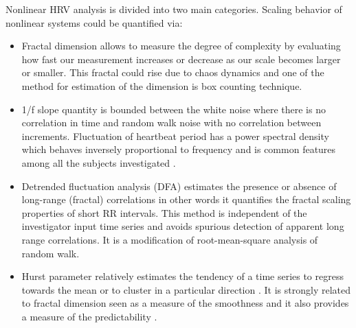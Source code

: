 Nonlinear HRV analysis is divided into two main categories. Scaling behavior of nonlinear systems could be quantified via:
\begin{itemize}
    \item Fractal dimension allows to measure the degree of complexity by evaluating how fast our measurement increases or decrease as our scale becomes larger or smaller. This fractal could rise due to chaos dynamics and one of the method for estimation of the dimension is box counting technique. 
    \item 1/f slope quantity is bounded between the white noise where there is no correlation in time and random walk noise with no correlation between increments. Fluctuation of heartbeat period has a power spectral density which behaves inversely proportional to frequency and is common features among all the subjects investigated \cite{27}. 
    
    \item Detrended fluctuation analysis (DFA) estimates the presence or absence of long-range (fractal) correlations \cite{22} in other words it quantifies the fractal scaling properties of short RR intervals. This method is independent of the investigator input time series and avoids spurious detection of apparent long range correlations. It is a modification of root-mean-square analysis of random walk. 
    \item Hurst parameter relatively estimates the tendency of a time series to regress towards the mean or to cluster in a particular direction \cite{23}. It is strongly related to fractal dimension seen as a measure of the smoothness and it also provides a measure of the predictability \cite{24}. 
\end{itemize}

